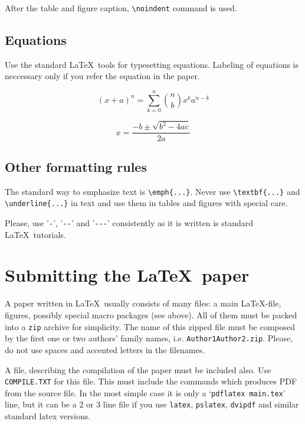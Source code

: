 \documentclass[10pt,a5paper]{article}
\begin{document}
\noindent After the table and figure caption, \verb+\noindent+ command is used.

\subsection{Equations}

Use the standard \LaTeX\ tools for typesetting equations. Labeling of equations
is neccessary only if you refer the equation in the paper.

\begin{equation}\label{eq:01}
  (x+a)^n=\sum_{k=0}^{n} \binom{n}{b} x^{k} a^{n-k}
\end{equation}

\begin{equation}\label{eq:02}
  x=\frac{-b\pm\sqrt{b^2-4ac}}{2a}
\end{equation}



\subsection{Other formatting rules}

The standard way to emphasize text is \verb+\emph{...}+. Never
use \verb+\textbf{...}+ and \verb+\underline{...}+ in text and use them in
tables and figures with special care.

Please, use '\verb+-+', '\verb+--+' and '\verb+---+' consistently as it is
written is standard \LaTeX\ tutorials.

\section{Submitting the \protect\LaTeX\ paper}

A paper written in \LaTeX\  usually consists of many files: a main \LaTeX-file,
figures, possibly special macro packages (see above). All of them must be
packed into a \verb+zip+ archive for simplicity. The name of this zipped file
must be composed by the first one or two authors' family names, i.e.
\verb+Author1Author2.zip+. Please, do not use spaces and accented letters in the
filenames.

A file, describing the compilation of the paper must be included also. Use
\verb+COMPILE.TXT+ for this file. This must include the commands which produces
PDF from the source file. In the most simple case it is only a
`\verb+pdflatex main.tex+' line, but it can be a 2 or 3 line file if you use
\verb+latex+, \verb+pslatex+, \verb+dvipdf+ and similar standard latex versions.
\end{document}
